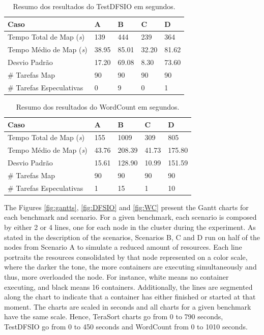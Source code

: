 \begin{table}[h!]
	\caption{Resumo dos resultados do TestDFSIO em segundos.} \label{tab:exp1IO}
	\begin{tabular*}{\hsize}{lllll} %
		\textbf{Caso} & \textbf{A} & \textbf{B} & \textbf{C} & \textbf{D}\\
		\hline
		Tempo Total de Map ({\it{s}}) & 139 & 444 & 239 & 364 \\
		Tempo Médio de Map ({\it{s}}) & 38.95 & 85.01 & 32.20 & 81.62 \\
		Desvio Padrão & 17.20 & 69.08 & 8.30 & 73.60 \\
		\# Tarefas Map & 90 & 90 & 90 & 90 \\
		\# Tarefas Especulativas & 0 & 9 & 0 & 1 \\
	\end{tabular*}
\end{table}


\begin{table}[h!]
	\caption{Resumo dos resultados do WordCount em segundos.} \label{tab:exp1WC}
	\begin{tabular*}{\hsize}{lllll} %
		\textbf{Caso} & \textbf{A} & \textbf{B} & \textbf{C} & \textbf{D}\\
		\hline
		Tempo Total de Map ({\it{s}}) & 155 & 1009 & 309 & 805 \\
		Tempo Médio de Map ({\it{s}}) & 43.76 & 208.39 & 41.73 & 175.80 \\
		Desvio Padrão & 15.61 & 128.90 & 10.99 & 151.59 \\
		\# Tarefas Map & 90 & 90 & 90 & 90 \\
		\# Tarefas Especulativas & 1 & 15 & 1 & 10 \\
	\end{tabular*}
\end{table}


The Figures \ref{fig:gantts}, \ref{fig:DFSIO} and \ref{fig:WC} present the Gantt charts for each benchmark and scenario. For a given benchmark, each scenario is composed by either 2 or 4 lines, one for each node in the cluster during the experiment. As stated in the description of the scenarios, Scenarios B, C and D run on half of the nodes from Scenario A to simulate a reduced amount of resources. Each line portraits the resources consolidated by that node represented on a color scale, where the darker the tone, the more containers are executing simultaneously and thus, more overloaded the node. For instance, white means no container executing, and black means 16 containers. Additionally, the lines are segmented along the chart to indicate that a container has either finished or started at that moment. The charts are  scaled in seconds and all charts for a given benchmark have the same scale. Hence, TeraSort charts go from 0 to 790 seconds, TestDFSIO go from 0 to 450 seconds and WordCount from 0 to 1010 seconds.


